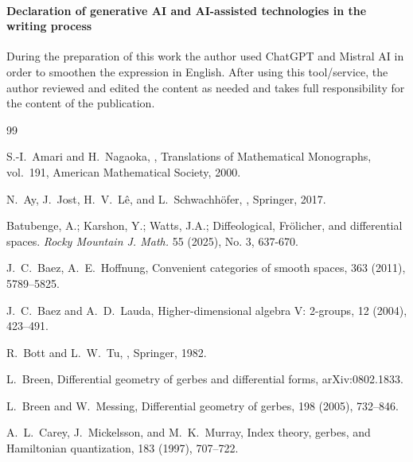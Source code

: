 \documentclass[11pt]{amsart}
\begin{document}
\vskip 12pt

\paragraph{\bf Declaration of generative AI and AI-assisted technologies in the writing process}

During the preparation of this work the author used ChatGPT and Mistral AI in order to smoothen the expression in English. After using this tool/service, the author reviewed and edited the content as needed and takes full responsibility for the content of the publication.
\begin{thebibliography}{99}
    
S.-I.~Amari and H.~Nagaoka,
,
\newblock Translations of Mathematical Monographs, vol.~191,
\newblock American Mathematical Society, 2000.

N.~Ay, J.~Jost, H.~V.~L\^e, and L.~Schwachh\"ofer,
,
\newblock Springer, 2017.

	 Batubenge, A.; Karshon, Y.; Watts, J.A.; Diffeological, Fr\"olicher, and differential spaces. \emph{Rocky Mountain J. Math.} 55 (2025), No. 3, 637-670.

J.~C.~Baez, A.~E.~Hoffnung,
\newblock Convenient categories of smooth spaces,
 363 (2011), 5789--5825.
	
J.~C.~Baez and A.~D.~Lauda,
\newblock Higher-dimensional algebra V: 2-groups,
 12 (2004), 423--491.

R.~Bott and L.~W.~Tu,
,
\newblock Springer, 1982.

L.~Breen,
\newblock Differential geometry of gerbes and differential forms,
\newblock arXiv:0802.1833.

L.~Breen and W.~Messing,
\newblock Differential geometry of gerbes,
 198 (2005), 732--846.

A.~L.~Carey, J.~Mickelsson, and M.~K.~Murray,
\newblock Index theory, gerbes, and Hamiltonian quantization,
 183 (1997), 707--722.


\end{thebibliography}
\end{document}
